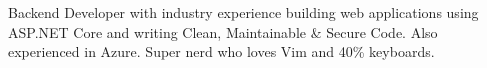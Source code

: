 

\begin{cvparagraph}

Backend Developer with industry experience building web applications using ASP.NET Core and writing Clean, Maintainable \& Secure Code. Also experienced in Azure. Super nerd who loves Vim and 40\% keyboards.
\end{cvparagraph}
